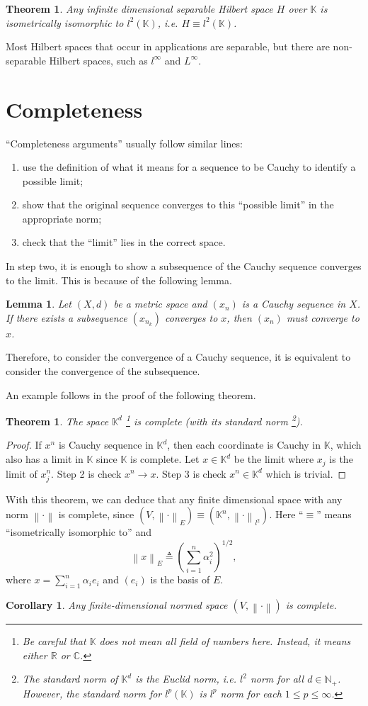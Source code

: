 \documentclass[12pt,a4paper]{article}
\numberwithin{equation}{section}
\theoremstyle{mystyle}
\newtheorem{theorem}[definition]{Theorem}
\newtheorem{lemma}[definition]{Lemma}
\newtheorem{corollary}[definition]{Corollary}
\newcommand{\R}{\mathbb{R}}
\newcommand{\N}{\mathbb{N}}
\newcommand{\K}{\mathbb{K}}
\newcommand{\norm}[1]{\left\lVert #1 \right\rVert}
\begin{document}
	\begin{theorem}
		Any infinite dimensional separable Hilbert space $H$ over $\K$ is isometrically isomorphic to $l^2(\K)$, i.e. $H\equiv l^2(\K)$.
	\end{theorem}

	Most Hilbert spaces that occur in applications are separable, but there are non-separable Hilbert spaces, such as $l^\infty$ and $L^\infty$.


	\section{Completeness}
	``Completeness arguments'' usually follow similar lines:
	\begin{enumerate}
		\item use the definition of what it means for a sequence to be Cauchy to identify a possible limit;
		\item show that the original sequence converges to this ``possible limit'' in the appropriate norm;
		\item check that the ``limit'' lies in the correct space.
	\end{enumerate}
	In step two, it is enough to show a subsequence of the Cauchy sequence converges to the limit. This is because of the following lemma.
	\begin{lemma}
		Let $(X,d)$ be a metric space and $(x_n)$ is a Cauchy sequence in $X$. If there exists a subsequence $(x_{n_k})$ converges to $x$, then $(x_n)$ must converge to $x$.
	\end{lemma}
	Therefore, to consider the convergence of a Cauchy sequence, it is equivalent to consider the convergence of the subsequence.

	An example follows in the proof of the following theorem.
	\begin{theorem}
		The space $\K^d$
		\footnote{Be careful that $\K$ does not mean all field of numbers here. Instead, it means either $\R$ or $\mathbb{C}$.}
		 is complete (with its standard norm
		 \footnote{The standard norm of $\K^d$ is the Euclid norm, i.e. $l^2$ norm for all $d\in \N_+$. However, the standard norm for $l^p(\K)$ is $l^p$ norm for each $1\leq p\leq \infty$.}).
	\end{theorem}
	\begin{proof}
		If $x^n$ is Cauchy sequence in $\K^d$, then each coordinate is Cauchy in $\K$, which also has a limit in $\K$ since $\K$ is complete. Let $x\in \K^d$ be the limit where $x_j$ is the limit of $x^n_j$. Step 2 is check $x^n\to x$. Step 3 is check $x^n\in \K^d$ which is trivial.
	\end{proof}
	With this theorem, we can deduce that any finite dimensional space with any norm $\norm{\cdot}$ is complete, since $(V,\norm{\cdot}_E)\equiv (\K^n, \norm{\cdot}_{l^2})$. Here ``$\equiv$'' means ``isometrically isomorphic to'' and 
	$$
	\norm{x}_E\triangleq \left(\sum_{i=1}^n \alpha_i^2\right)^{1/2},
	$$
	where $x=\sum_{i=1}^n \alpha_i e_i$ and $(e_i)$ is the basis of $E$.
	\begin{corollary}
		Any finite-dimensional normed space $(V,\norm{\cdot})$ is complete.
	\end{corollary}
	
\end{document}
